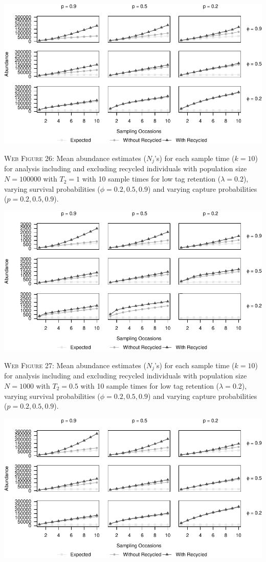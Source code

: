 \documentclass[]{article}
\begin{document}
\includegraphics{Appendix_BW_files/figure-latex/26_abundance_L_GJSTL2-1.pdf}

\textsc{Web Figure 26:} Mean abundance estimates (\(N_j\)'s) for each
sample time (\(k=10\)) for analysis including and excluding recycled
individuals with population size \(N=100000\) with \(T_2=1\) with 10
sample times for low tag retention (\(\lambda=0.2\)), varying survival
probabilities (\(\phi=0.2,0.5,0.9\)) and varying capture probabilities
(\(p=0.2,0.5,0.9\)).

\newpage

\includegraphics{Appendix_BW_files/figure-latex/27_abundance_L_GJSTL4-1.pdf}

\textsc{Web Figure 27:} Mean abundance estimates (\(N_j\)'s) for each
sample time (\(k=10\)) for analysis including and excluding recycled
individuals with population size \(N=1000\) with \(T_2=0.5\) with 10
sample times for low tag retention (\(\lambda=0.2\)), varying survival
probabilities (\(\phi=0.2,0.5,0.9\)) and varying capture probabilities
(\(p=0.2,0.5,0.9\)).

\includegraphics{Appendix_BW_files/figure-latex/28_abundance_L_GJSTL3-1.pdf}
\end{document}
